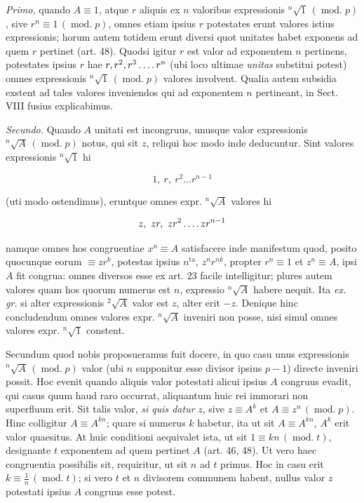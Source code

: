 \emph{Primo,} quando $A\equiv1$, atque $r$ aliquis ex $n$ valoribus expressionis ${}^{n}\!\surd {1}\,(\operatorname{mod.}p)$, sive $r^n\equiv1\,(\operatorname{mod.}p)$, omnes etiam ipsius $r$ potestates erunt valores istius expressionis; horum autem totidem erunt diversi quot unitates habet exponens ad quem $r$ pertinet (art. 48). Quodsi igitur $r$ est valor ad exponentem $n$ pertinens, potestates ipsius $r$ hae $r,r^2,r^3\mathinner{\ldotp\ldotp\ldotp\ldotp} r^n$ (ubi loco ultimae \emph{unitas} substitui potest) omnes expressionis ${}^{n}\!\surd {1}\,(\operatorname{mod.}p)$ valores involvent. Qualia autem subsidia exstent ad tales valores inveniendos qui ad exponentem $n$ pertineant, in Sect. VIII fusius explicabimus.

\emph{Secundo.} Quando $A$ unitati est incongruus, unusque valor expressionis ${}^{n}\!\surd {A}\,(\operatorname{mod.}p)$ notus, qui sit $z$, reliqui hoc modo inde deducuntur. Sint valores expressionis ${}^{n}\!\surd {1}$ hi

\[1,\ r,\ r^2\ldots r^{n-1}\]

(uti modo ostendimus), eruntque omnes expr. ${}^{n}\!\surd {A}$ valores hi

\[z,\ zr,\ zr^2\mathinner{\ldotp\ldotp\ldotp\ldotp} zr^{n-1}\]

namque omnes hos congruentiae $x^n\equiv A$ satisfacere inde manifestum quod, posito quocunque eorum $\equiv zr^k$, potestas ipsius $n^{\mathrm{ta}}$, $z^n r^{nk}$, propter $r^n\equiv1$ et $z^n\equiv A$, ipsi $A$ fit congrua: omnes diversos esse ex art. 23 facile intelligitur; plures autem valores quam hos quorum numerus est $n$, expressio ${}^{n}\!\surd {A}$ habere nequit. Ita \emph{ex. gr.} si alter expressionis ${}^{2}\!\surd {A}$ valor est $z$, alter erit $-z$. Denique hinc concludendum omnes valores expr. ${}^{n}\!\surd {A}$ inveniri non posse, nisi simul omnes valores expr. ${}^{n}\!\surd {1}$ constent.


Secundum quod nobis proposueramus fuit docere, in quo casu unus expressionis ${}^{n}\!\surd {A}\,(\operatorname{mod.}p)$ valor (ubi $n$ supponitur esse divisor ipsius $p-1$) directe inveniri possit. Hoc evenit quando aliquis valor potestati alicui ipsius $A$ congruus evadit, qui casus quum haud raro occurrat, aliquantum huic rei immorari non superfluum erit. Sit talis valor, \emph{si quis datur} $z$, sive $z\equiv A^k$ et $A\equiv z^n\,(\operatorname{mod.}p)$. Hinc colligitur $A\equiv A^{kn}$; quare si numerus $k$ habetur, ita ut sit $A\equiv A^{kn}$, $A^k$ erit valor quaesitus. At huic conditioni aequivalet ista, ut sit $1\equiv kn\,(\operatorname{mod.}t)$, designante $t$ exponentem ad quem pertinet $A$ (art. 46, 48). Ut vero haec congruentia possibilis sit, requiritur, ut sit $n$ ad $t$ primus. Hoc in casu erit $k\equiv\frac{1}{n}\,(\operatorname{mod.}t)$; si vero $t$ et $n$ divisorem communem habent, nullus valor $z$ potestati ipsius $A$ congruus esse potest.

